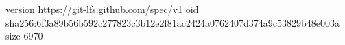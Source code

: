 version https://git-lfs.github.com/spec/v1
oid sha256:6f3a89b56b592c277823c3b12e2f81ac2424a0762407d374a9c53829b48e003a
size 6970
